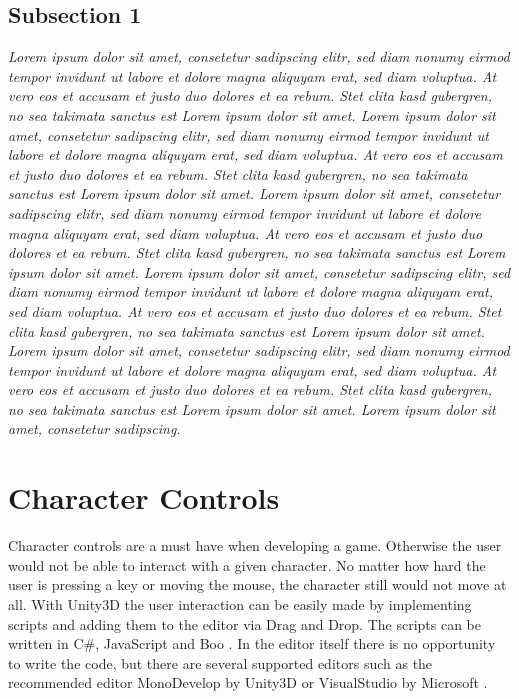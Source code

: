 \documentclass[conference]{IEEEtran}
\newcommand{\csh}{C{\#}}
\begin{document}
\subsection{Subsection 1}

\emph{Lorem ipsum dolor sit amet, consetetur sadipscing elitr, sed diam nonumy eirmod tempor invidunt ut labore et dolore magna aliquyam erat, sed diam voluptua. At vero eos et accusam et justo duo dolores et ea rebum. Stet clita kasd gubergren, no sea takimata sanctus est Lorem ipsum dolor sit amet. Lorem ipsum dolor sit amet, consetetur sadipscing elitr, sed diam nonumy eirmod tempor invidunt ut labore et dolore magna aliquyam erat, sed diam voluptua. At vero eos et accusam et justo duo dolores et ea rebum. Stet clita kasd gubergren, no sea takimata sanctus est Lorem ipsum dolor sit amet.
Lorem ipsum dolor sit amet, consetetur sadipscing elitr, sed diam nonumy eirmod tempor invidunt ut labore et dolore magna aliquyam erat, sed diam voluptua. At vero eos et accusam et justo duo dolores et ea rebum. Stet clita kasd gubergren, no sea takimata sanctus est Lorem ipsum dolor sit amet. Lorem ipsum dolor sit amet, consetetur sadipscing elitr, sed diam nonumy eirmod tempor invidunt ut labore et dolore magna aliquyam erat, sed diam voluptua. At vero eos et accusam et justo duo dolores et ea rebum. Stet clita kasd gubergren, no sea takimata sanctus est Lorem ipsum dolor sit amet.
Lorem ipsum dolor sit amet, consetetur sadipscing elitr, sed diam nonumy eirmod tempor invidunt ut labore et dolore magna aliquyam erat, sed diam voluptua. At vero eos et accusam et justo duo dolores et ea rebum. Stet clita kasd gubergren, no sea takimata sanctus est Lorem ipsum dolor sit amet. Lorem ipsum dolor sit amet, consetetur sadipscing.}

\section{Character Controls}

Character controls are a must have when developing a game. Otherwise the user would not be able to interact with a given character. No matter how hard the user is pressing a key or moving the mouse, the character still would not move at all.
With Unity3D the user interaction can be easily made by implementing scripts and adding them to the editor via Drag and Drop. The scripts can be written in \csh, JavaScript and Boo \cite{b1}. In the editor itself there is no opportunity to write the code, but there are several supported editors such as the recommended editor MonoDevelop by Unity3D or VisualStudio by Microsoft \cite{b1}.
\end{document}
